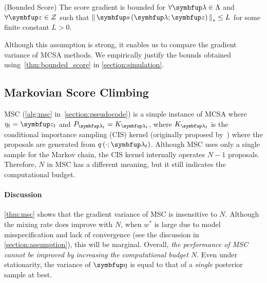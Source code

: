 \begin{assumption}{(Bounded Score)}\label{thm:bounded_score}
  The score gradient is bounded for \(\forall \vlambda \in \Lambda\) and \(\forall \vz \in \mathcal{Z}\) such that \(\norm{\vs\left(\vlambda; \vz\right)}_* \leq L \) for some finite constant \(L > 0\).
\end{assumption}
\vspace{-0.05in}
Although this assumption is strong, it enables us to compare the gradient variance of MCSA methods.
We empirically justify the bounds obtained using~\cref{thm:bounded_score} in \cref{section:simulation}.

\vspace{-0.07in}
\subsection{Markovian Score Climbing}
\vspace{-0.07in}
MSC (\cref{alg:msc} in~\cref{section:pseudocode}) is a simple instance of MCSA where \(\eta_t = \vz_t\) and \(P_{\vlambda_t} = K_{\vlambda_t}\), where \(K_{\vlambda_t}\) is the conditional importance sampling (CIS) kernel (originally proposed by~\citet{andrieu_uniform_2018}) where the proposals are generated from \(q\left(\cdot; \vlambda_t\right)\).
Although MSC uses only a single sample for the Markov chain, the CIS kernel internally operates \(N-1\) proposals.
Therefore, \(N\) in MSC has a different meaning, but it still indicates the computational budget.


\vspace{0.04in}


\vspace{-0.15in}
\paragraph{Discussion}
\cref{thm:msc} shows that the gradient variance of MSC is insensitive to \(N\).
Although the mixing rate does improve with \(N\), when \(w^*\) is large due to model misspecification and lack of convergence (see the discussion in \cref{section:assumption}), this will be marginal.
Overall, \textit{the performance of MSC cannot be improved by increasing the computational budget \(N\)}.
Even under stationarity, the variance of \(\veta\) is equal to that of a \textit{single} posterior sample at best.

\vspace{-0.1in}
